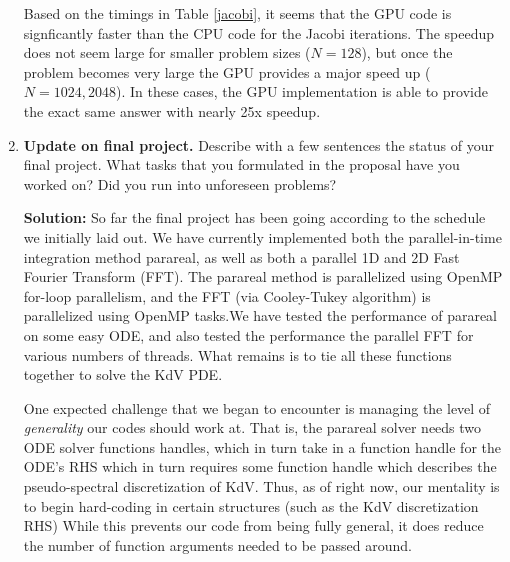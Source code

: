 \documentclass[10pt]{article}
\begin{document}
\begin{enumerate}
Based on the timings in Table \ref{jacobi}, it seems that the GPU code is signficantly faster than the CPU code for the Jacobi iterations. The speedup does not seem large for smaller problem sizes ($N=128$), but once the problem becomes very large the GPU provides a major speed up ($N=1024,2048$). In these cases, the GPU implementation is able to provide the exact same answer with nearly 25x speedup.







\item \textbf{Update on final project.} Describe with a few sentences the status of your final project. What tasks that you formulated in the proposal have you worked on? Did you run into unforeseen problems?

\textbf{Solution:} So far the final project has been going according to the schedule we initially laid out. We have currently implemented both the parallel-in-time integration method parareal, as well as both a parallel 1D and 2D Fast Fourier Transform (FFT). The parareal method is parallelized using OpenMP for-loop parallelism, and the FFT (via Cooley-Tukey algorithm) is parallelized using OpenMP tasks.We have tested the performance of parareal on some easy ODE, and also tested the performance the parallel FFT for various numbers of threads. What remains is to tie all these functions together to solve the KdV PDE. 

One expected challenge that we began to encounter is managing the level of \textit{generality} our codes should work at. That is, the parareal solver needs two ODE solver functions handles, which in turn take in a function handle for the ODE's RHS which in turn requires some function handle which describes the pseudo-spectral discretization of KdV. Thus, as of right now, our mentality is to begin hard-coding in certain structures (such as the KdV discretization RHS) While this prevents our code from being fully general, it does reduce the number of function arguments needed to be passed around.




\end{enumerate}
	







    
    
\end{document}
